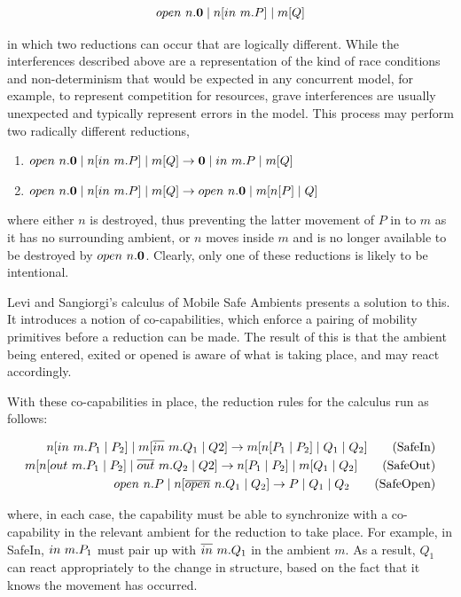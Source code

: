 \begin{equation}
open\ n.\textbf{0} \;|\; n[in\ m.P] \;|\; m[Q]
\end{equation}

\noindent in which two reductions can occur that are logically
different.  While the interferences described above are a
representation of the kind of race conditions and non-determinism that
would be expected in any concurrent model, for example, to represent
competition for resources, grave interferences are usually unexpected
and typically represent errors in the model.  This process may perform
two radically different reductions,

\begin{enumerate}
\item $open\ n.\textbf{0} \;|\; n[in\ m.P] \;|\; m[Q] \rightarrow \textbf{0} \;|\;
in\ m.P \;|\; m[Q]$
\item $open\ n.\textbf{0} \;|\; n[in\ m.P] \;|\; m[Q] \rightarrow
open\ n.\textbf{0} \;|\; m[n[P] \;|\; Q]$
\end{enumerate}

\noindent where either $n$ is destroyed, thus preventing the latter
movement of $P$ in to $m$ as it has no surrounding ambient, or $n$ moves
inside $m$ and is no longer available to be destroyed by
$open\ n.\textbf{0}$.  Clearly, only one of these reductions is likely to be
intentional.  

Levi and Sangiorgi's calculus of Mobile Safe Ambients \cite{safeamb00,
sangiorgi:mobsafeambients} presents a solution to this.  It introduces a
notion of co-capabilities, which enforce a pairing of mobility
primitives before a reduction can be made.  The result of this is that
the ambient being entered, exited or opened is aware of what is taking
place, and may react accordingly.

With these co-capabilities in place, the reduction rules for the
calculus run as follows:

\begin{align}
 n[in\ m.P_1 \;|\; P_2] \;|\; m[\overline{in}\ m.Q_1 \;|\; Q2]
\rightarrow
m[n[P_1 \;|\; P_2] \;|\; Q_1 \;|\; Q_2] \tag{SafeIn}\\
 m[n[out\ m.P_1 \;|\; P_2] \;|\; \overline{out}\ m.Q_2 \;|\; Q2]
\rightarrow
n[P_1 \;|\; P_2] \;|\; m[Q_1 \;|\; Q_2] \tag{SafeOut}\\
 open\ n.P \;|\; n[\overline{open}\ n.Q_1 \;|\; Q_2]
\rightarrow
P \;|\; Q_1 \;|\; Q_2 \tag{SafeOpen} 
\end{align}

\noindent where, in each case, the capability must be able to
synchronize with a co-capability in the relevant ambient for the
reduction to take place.  For example, in SafeIn, $in\ m.P_1$ must
pair up with $\overline{in}\ m.Q_1$ in the ambient $m$.  As a result, $Q_1$
can react appropriately to the change in structure, based on the fact
that it knows the movement has occurred.

